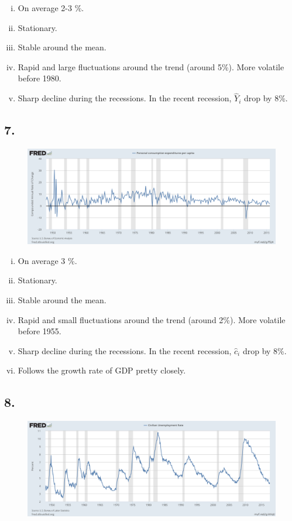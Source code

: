 \documentclass[12pt]{article}
\theoremstyle{definition}
\begin{document}
\begin{enumerate}[(i)]
	\item On average 2-3 \%.
	\item Stationary.
	\item Stable around the mean.
	\item Rapid and large fluctuations around the trend (around 5\%). More volatile before 1980.
	\item Sharp decline during the recessions. In the recent recession, $\hat{Y}_i$ drop by 8\%.
\end{enumerate}

\subsection*{7.}
\begin{figure}[H]
	\centering
	\includegraphics[width=0.9\linewidth]{plot7}
	\label{fig:plot7}
\end{figure}

\begin{enumerate}[(i)]
	\item On average 3 \%.
	\item Stationary.
	\item Stable around the mean.
	\item Rapid and small fluctuations around the trend (around 2\%). More volatile before 1955.
	\item Sharp decline during the recessions. In the recent recession, $\hat{c}_i$ drop by 8\%.
	\item Follows the growth rate of GDP pretty closely.
\end{enumerate}


\subsection*{8.}
\begin{figure}[H]
	\centering
	\includegraphics[width=0.9\linewidth]{plot8}
	\label{fig:plot8}
\end{figure}
\end{document}
